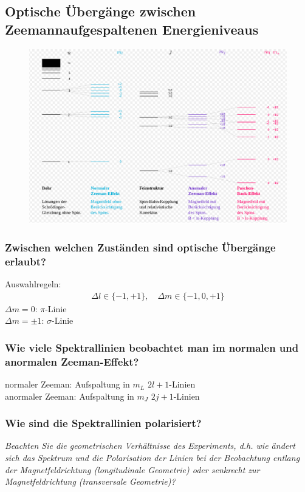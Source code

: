 \subsection{Optische Übergänge zwischen Zeemannaufgespaltenen Energieniveaus}
\begin{figure}[H]
    \centering
    \includegraphics[scale=0.4]{pictures/Aufspaltung.png}
\end{figure}

\subsubsection{Zwischen welchen Zuständen sind optische Übergänge erlaubt?}
Auswahlregeln: 
\begin{align*}
    \Delta l\in\{-1,+1\},\quad\Delta m\in\{-1,0,+1\}
\end{align*}
$\Delta m=0$: $\pi$-Linie \\\noindent
$\Delta m=\pm1$: $\sigma$-Linie

\subsubsection{Wie viele Spektrallinien beobachtet man im normalen und anormalen Zeeman-Effekt?}
normaler Zeeman:  Aufspaltung in $m_L$ \to $2l+1$-Linien \\\noindent
anormaler Zeeman: Aufspaltung in $m_J$ \to $2j+1$-Linien

\subsubsection{Wie sind die Spektrallinien polarisiert?}
\textit{Beachten Sie die geometrischen Verhältnisse des Experiments, d.h. wie ändert sich das Spektrum und die Polarisation der Linien
bei der Beobachtung entlang der Magnetfeldrichtung (longitudinale Geometrie) oder senkrecht zur Magnetfeldrichtung (transversale
Geometrie)?}

